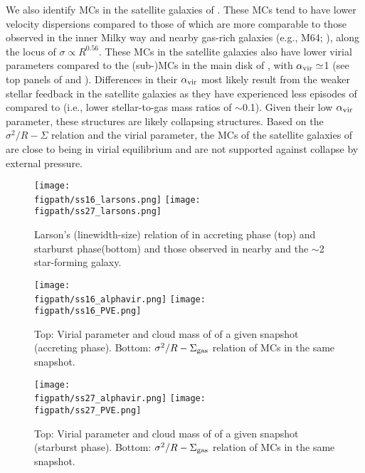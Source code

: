 \documentclass[apj]{emulateapj} %
\begin{document}
{We also identify MCs in the satellite galaxies of \flower. These MCs
tend to have lower velocity dispersions compared to those of \flower which are more comparable
to those observed in the inner Milky way and
nearby gas-rich galaxies (e.g., M64; \citealt{Oka01a, Rosolowsky05a, Heyer09a}),
along the locus of $\sigma\propto R^{0.56}$.
These MCs in the satellite galaxies also have
lower virial parameters compared to the (sub-)MCs in the main disk of \flower,
with $\alpha_{\rm vir}\simeq$1 (see top panels of  and ).
Differences in their $\alpha_{\rm vir}$ most likely result from the weaker
stellar feedback in the satellite galaxies as they have experienced less episodes of \SF compared to
\flower (i.e., lower stellar-to-gas mass ratios of $\sim$0.1). Given their low $\alpha_{\rm vir}$ parameter,
these structures are likely collapsing structures.
Based on the $\sigma^2/R - \Sigma$ relation and the virial parameter,
the MCs of the satellite galaxies of
\flower are close to being in virial equilibrium
and are not supported against collapse by external pressure. %


\begin{figure*}[htbp]
\centering
\texttt{[image: \\figpath/ss16\_larsons.png]}
\texttt{[image: \\figpath/ss27\_larsons.png]}
\caption{
Larson's (linewidth-size) relation of \flower in
accreting phase (top) and
starburst phase(bottom) and
those observed in nearby and the \z$\sim$2 star-forming galaxy.
\label{fig:larsons_single}}
\end{figure*}


\begin{figure*}[htbp]
\centering
\texttt{[image: \\figpath/ss16\_alphavir.png]}
\texttt{[image: \\figpath/ss16\_PVE.png]}
\caption{
Top: Virial parameter and cloud mass of \flower of a given snapshot (accreting phase).
Bottom: $\sigma^2/R - \Sigma_{\rm gas}$ relation of MCs in the same snapshot.
\label{fig:alpha16}}
\end{figure*}


\begin{figure*}[htbp]
\centering
\texttt{[image: \\figpath/ss27\_alphavir.png]}
\texttt{[image: \\figpath/ss27\_PVE.png]}
\caption{
Top: Virial parameter and cloud mass of \flower of a given snapshot (starburst phase).
Bottom: $\sigma^2/R - \Sigma_{\rm gas}$ relation of MCs in the same snapshot.
\label{fig:alpha27}}
\end{figure*}




}
\end{document}
